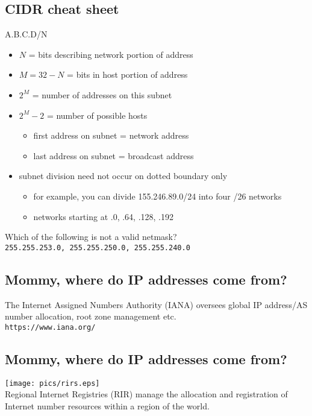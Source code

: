 \documentclass[xga]{xdvislides}
\begin{document}
\subsection{CIDR cheat sheet}
A.B.C.D/N
\begin{itemize}
	\item $N$ = bits describing network portion of address
	\item $M=32-N$ = bits in host portion of address
	\item $2^M$ = number of addresses on this subnet
	\item $2^M - 2$ = number of possible hosts
		\begin{itemize}
			\item first address on subnet = network address
			\item last address on subnet = broadcast address
		\end{itemize}
	\item subnet division need not occur on dotted boundary only
		\begin{itemize}
			\item for example, you can divide 155.246.89.0/24
				into four /26 networks
			\item networks starting at .0, .64, .128, .192
		\end{itemize}
\end{itemize}
\addvspace{.5in}
Which of the following is not a valid netmask? \\
\verb+255.255.253.0, 255.255.250.0, 255.255.240.0+

\subsection{Mommy, where do IP addresses come from?}
\Huge
\vfill
\begin{center}
The Internet Assigned Numbers Authority (IANA) oversees global IP
address/AS number allocation, root zone management etc.
\\
\vspace{.5in}
\verb+https://www.iana.org/+
\end{center}
\vfill
\Normalsize

\subsection{Mommy, where do IP addresses come from?}
\vspace*{\fill}
\begin{center}
	\texttt{[image: pics/rirs.eps]} \\
	\vspace{.5in}
	Regional Internet Registries (RIR) manage the allocation and
registration of Internet number resources within a region of the world.
\end{center}
\vspace*{\fill}
\end{document}
